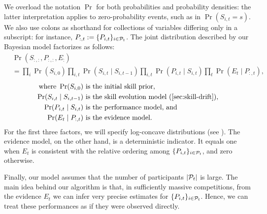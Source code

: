 We overload the notation $\Pr$ for both probabilities and probability densities: the latter interpretation applies to zero-probability events, such as in $\Pr(S_{i,t} = s)$. We also use colons as shorthand for collections of variables differing only in a subscript: for instance, $P_{:,t}:=\{P_{i,t}\}_{i\in\mathcal{P}_t}$. The joint distribution described by our Bayesian model factorizes as follows:
\begin{align}
    &\Pr(S_{:,:}, P_{:,:}, E_:) \label{eq:model}
    \\&= \prod_i \Pr(S_{i,0})
    \prod_{i,t} \Pr(S_{i,t}\mid S_{i,t-1})
    \prod_{i,t} \Pr(P_{i,t}\mid S_{i,t})
    \prod_t \Pr(E_t\mid P_{:,t}), \nonumber
\end{align}
\vspace{-1.5em}
\begin{align*}
    \text{where } \Pr(S_{i,0}) &\text{ is the initial skill prior,}
    \\\Pr(S_{i,t}\mid S_{i,t-1}) &\text{ is the skill evolution model (\Cref{sec:skill-drift}),}
    \\\Pr(P_{i,t}\mid S_{i,t}) &\text{ is the performance model, and}
    \\\Pr(E_t\mid P_{:,t}) &\text{ is the evidence model.}
\end{align*}
For the first three factors, we will specify log-concave distributions (see ). The evidence model, on the other hand, is a deterministic indicator. It equals one when $E_t$ is consistent with the relative ordering among $\{P_{i,t}\}_{i\in\mathcal{P}_t}$, and zero otherwise.

Finally, our model assumes that the number of participants $|\mathcal{P}_t|$ is large. %
The main idea behind our algorithm is that, in sufficiently massive competitions, from the evidence $E_t$ we can infer very precise estimates for $\{P_{i,t}\}_{i\in\mathcal{P}_t}$. Hence, we can treat these performances as if they were observed directly.

